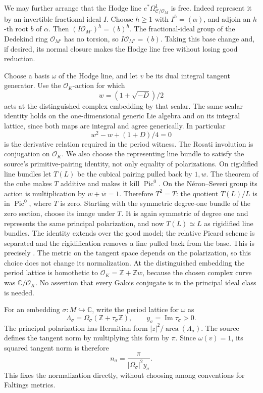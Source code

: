 We may further arrange that the Hodge line
\(e^*\Omega^1_{\mathcal C/\mathcal O_M}\) is free.
Indeed represent it by an invertible fractional ideal \(I\).
Choose \(h\ge1\) with \(I^h=(\alpha)\), and adjoin an
\(h\)-th root \(b\) of \(\alpha\).
Then \((I\mathcal O_{M'})^h=(b)^h\).
The fractional-ideal group of the Dedekind ring
\(\mathcal O_{M'}\) has no torsion, so
\(I\mathcal O_{M'}=(b)\).
Taking this base change and, if desired, its normal closure
makes the Hodge line free without losing good reduction.

Choose a basis \(\omega\) of the Hodge line, and let \(v\)
be its dual integral tangent generator.
Use the \(\mathcal O_K\)-action for which
\[
               w=(1+\sqrt{-D})/2
\]
acts at the distinguished complex embedding by that scalar.
The same scalar identity holds on the one-dimensional
generic Lie algebra and on its integral lattice, since
both maps are integral and agree generically.
In particular
\[
                     w^2-w+(1+D)/4=0
\]
is the derivative relation required in the period witness.
The Rosati involution is conjugation on \(\mathcal O_K\).
We also choose the representing line bundle to satisfy
the source's primitive-pairing identity, not only equality
of polarizations.  On rigidified line bundles let
\(T(L)\) be the cubical pairing pulled back by \(1,w\).
The theorem of the cube makes \(T\) additive and makes
it kill \(\operatorname{Pic}^0\).
On the N\'eron--Severi group its action is multiplication
by \(w+\overline w=1\).
Therefore \(T^2=T\): the quotient \(T(L)/L\) is in
\(\operatorname{Pic}^0\), where \(T\) is zero.
Starting with the symmetric degree-one bundle of the
zero section, choose its image under \(T\).
It is again symmetric of degree one and represents the
same principal polarization, and now
\(T(L)\simeq L\) as rigidified line bundles.
The identity extends over the good model; the relative
Picard scheme is separated and the rigidification
removes a line pulled back from the base.
This is precisely .
The metric on the tangent space depends on the
polarization, so this choice does not change its
normalization.
At the distinguished embedding the period lattice is
homothetic to \(\mathcal O_K=\mathbb Z+\mathbb Zw\),
because the chosen complex curve was
\(\mathbb C/\mathcal O_K\).
No assertion that every Galois conjugate is in the principal
ideal class is needed.

For an embedding \(\sigma:M\hookrightarrow\mathbb C\), write
the period lattice for \(\omega\) as
\[
                   \Lambda_\sigma=
                     \Omega_\sigma(\mathbb Z+\tau_\sigma\mathbb Z),
       \qquad y_\sigma=\operatorname{Im}\tau_\sigma>0 .
\]
The principal polarization has Hermitian form
\(|z|^2/\operatorname{area}(\Lambda_\sigma)\).
The source defines the tangent norm by multiplying this
form by \(\pi\).
Since \(\omega(v)=1\), its squared tangent norm is therefore
\begin{equation}\label{eq:sr-cm-tangent-norm}
                  n_\sigma=
                   \frac{\pi}{|\Omega_\sigma|^2y_\sigma}.
\end{equation}
This fixes the normalization directly, without choosing
among conventions for Faltings metrics.

